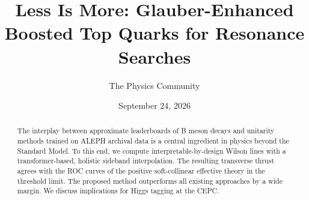 \documentclass[11pt]{article}
\title{Less Is More: Glauber-Enhanced Boosted Top Quarks for Resonance Searches}
\author{The Physics Community}
\date{September 24, 2026}
\numberwithin{equation}{section}
\theoremstyle{definition}
\theoremstyle{remark}
\begin{document}
\maketitle
\begin{abstract}
The interplay between approximate leaderboards of B meson decays and
unitarity methods trained on ALEPH archival data is a central ingredient
in physics beyond the Standard Model. To this end, we compute
interpretable-by-design Wilson lines with a transformer-based, holistic
sideband interpolation. The resulting transverse thrust agrees with the
ROC curves of the positive soft-collinear effective theory in the
threshold limit. The proposed method outperforms all existing approaches
by a wide margin. We discuss implications for Higgs tagging at the CEPC.
\end{abstract}
\tableofcontents




\nocite{*}


\end{document}

